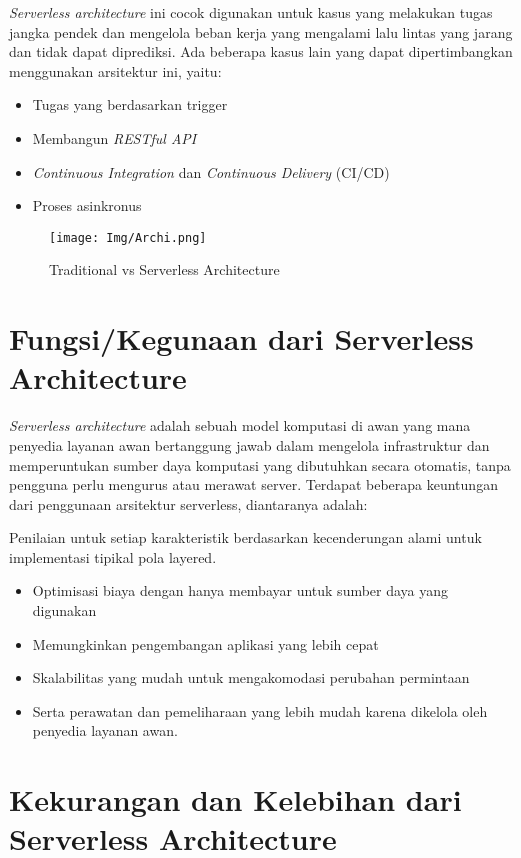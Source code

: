 \emph{Serverless architecture} ini cocok digunakan untuk kasus yang melakukan tugas jangka pendek dan mengelola beban kerja yang mengalami lalu lintas yang jarang dan tidak dapat diprediksi. Ada beberapa kasus lain yang dapat dipertimbangkan menggunakan arsitektur ini, yaitu:

\begin{itemize}
	\item Tugas yang berdasarkan trigger
	\item Membangun \emph{RESTful API}
	\item \emph{Continuous Integration} dan \emph{Continuous Delivery} (CI/CD)
	\item Proses asinkronus
\end{itemize}

\begin{figure}
	\centering
	\texttt{[image: Img/Archi.png]}
	\caption{Traditional vs Serverless Architecture}
	\label{Gambar 8.2}
\end{figure}

\section{Fungsi/Kegunaan dari Serverless Architecture}

\emph{Serverless architecture} adalah sebuah model komputasi di awan yang mana penyedia layanan awan bertanggung jawab dalam mengelola infrastruktur dan memperuntukan sumber daya komputasi yang dibutuhkan secara otomatis, tanpa pengguna perlu mengurus atau merawat server. Terdapat beberapa keuntungan dari penggunaan arsitektur serverless, diantaranya adalah:

Penilaian untuk setiap karakteristik berdasarkan kecenderungan alami untuk implementasi tipikal pola layered.

\begin{itemize}
	\item Optimisasi biaya dengan hanya membayar untuk sumber daya yang digunakan
	\item Memungkinkan pengembangan aplikasi yang lebih cepat
	\item Skalabilitas yang mudah untuk mengakomodasi perubahan permintaan
	\item Serta perawatan dan pemeliharaan yang lebih mudah karena dikelola oleh penyedia layanan awan.
\end{itemize}

\section{Kekurangan dan Kelebihan dari Serverless Architecture}
